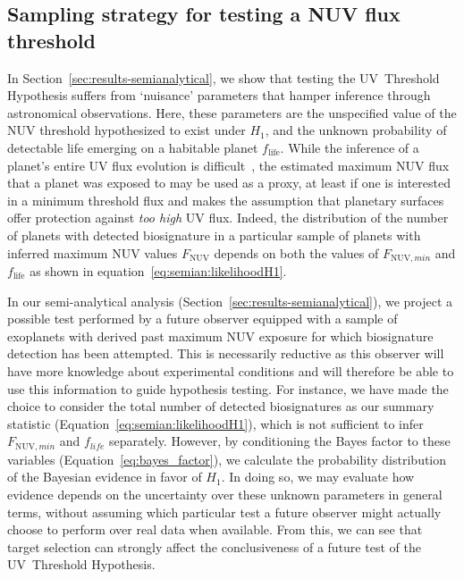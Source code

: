 \documentclass[twocolumn,twocolappendix,linenumbers]{aastex631}
\begin{document}
\subsection{Sampling strategy for testing a \gls{NUV} flux threshold} %
In Section~\ref{sec:results-semianalytical}, we show that testing the UV~Threshold Hypothesis suffers from `nuisance' parameters that hamper inference through astronomical observations.
Here, these parameters are the unspecified value of the \gls{NUV} threshold hypothesized to exist under $H_1$, and the unknown probability of detectable life emerging on a habitable planet $f_{\mathrm{life}}$.
While the inference of a planet's entire \gls{UV} flux evolution is difficult~\citep[e.g.,][]{Richey-Yowell2023}, the estimated maximum \gls{NUV} flux that a planet was exposed to may be used as a proxy, at least if one is interested in a minimum threshold flux and makes the assumption that planetary surfaces offer protection against \textit{too high} UV flux.
Indeed, the distribution of the number of planets with detected biosignature in a particular sample of planets with inferred maximum \gls{NUV} values $F_{\mathrm{NUV}}$ depends on both the values of $F_{\mathrm{NUV},min}$ and $f_{\mathrm{life}}$ as shown in equation~\ref{eq:semian:likelihoodH1}.

In our semi-analytical analysis (Section~\ref{sec:results-semianalytical}), we project a possible test performed by a future observer equipped with a sample of exoplanets with derived past maximum \gls{NUV} exposure for which biosignature detection has been attempted.
This is necessarily reductive as this observer will have more knowledge about experimental conditions and will therefore be able to use this information to guide hypothesis testing.
For instance, we have made the choice to consider the total number of detected biosignatures as our summary statistic (Equation~\ref{eq:semian:likelihoodH1}), which is not sufficient to infer $F_{\mathrm{NUV},min}$ and $f_{life}$ separately.
However, by conditioning the Bayes factor to these variables (Equation~\ref{eq:bayes_factor}), we calculate the probability distribution of the Bayesian evidence in favor of $H_1$.
In doing so, we may evaluate how evidence depends on the uncertainty over these unknown parameters in general terms, without assuming which particular test a future observer might actually choose to perform over real data when available.
From this, we can see that target selection can strongly affect the conclusiveness of a future test of the UV~Threshold Hypothesis.
\end{document}
